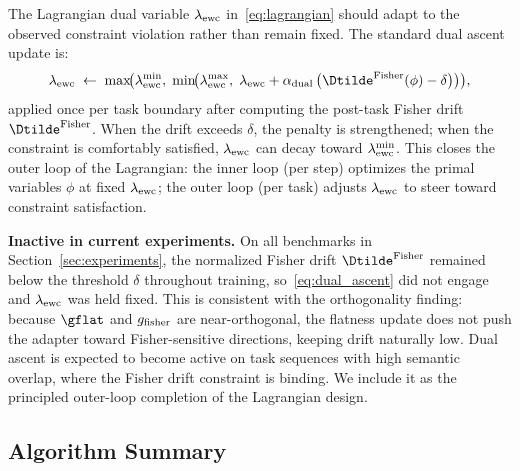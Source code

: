 The Lagrangian dual variable $\lambda_{\mathrm{ewc}}$ in~\eqref{eq:lagrangian} should adapt to
the observed constraint violation rather than remain fixed.
The standard dual ascent update is:
\begin{equation}
  \lambdaewc \;\leftarrow\; \max\!\bigl(\lambdaewc^{\min},\;
    \min\!\bigl(\lambdaewc^{\max},\;
      \lambdaewc + \alpha_{\mathrm{dual}}\,
      \bigl(\Dtilde^{\mathrm{Fisher}}(\phi) - \delta\bigr)\bigr)\bigr),
  \label{eq:dual_ascent}
\end{equation}
applied once per task boundary after computing the post-task Fisher drift
$\Dtilde^{\mathrm{Fisher}}$.
When the drift exceeds $\delta$, the penalty is strengthened; when the constraint
is comfortably satisfied, $\lambda_{\mathrm{ewc}}$ can decay toward $\lambda_{\mathrm{ewc}}^{\min}$.
This closes the outer loop of the Lagrangian: the inner loop (per step) optimizes
the primal variables $\phi$ at fixed $\lambda_{\mathrm{ewc}}$; the outer loop (per task) adjusts
$\lambda_{\mathrm{ewc}}$ to steer toward constraint satisfaction.

\textbf{Inactive in current experiments.}
On all benchmarks in Section~\ref{sec:experiments}, the normalized Fisher drift
$\Dtilde^{\mathrm{Fisher}}$ remained below the threshold $\delta$ throughout training,
so~\eqref{eq:dual_ascent} did not engage and $\lambda_{\mathrm{ewc}}$ was held fixed.
This is consistent with the orthogonality finding: because $\gflat$ and $g_{\mathrm{fisher}}$ are
near-orthogonal, the flatness update does not push the adapter toward Fisher-sensitive
directions, keeping drift naturally low.
Dual ascent is expected to become active on task sequences with high semantic overlap,
where the Fisher drift constraint is binding.
We include it as the principled outer-loop completion of the Lagrangian design.

\subsection{Algorithm Summary}
\label{sec:algorithm}

